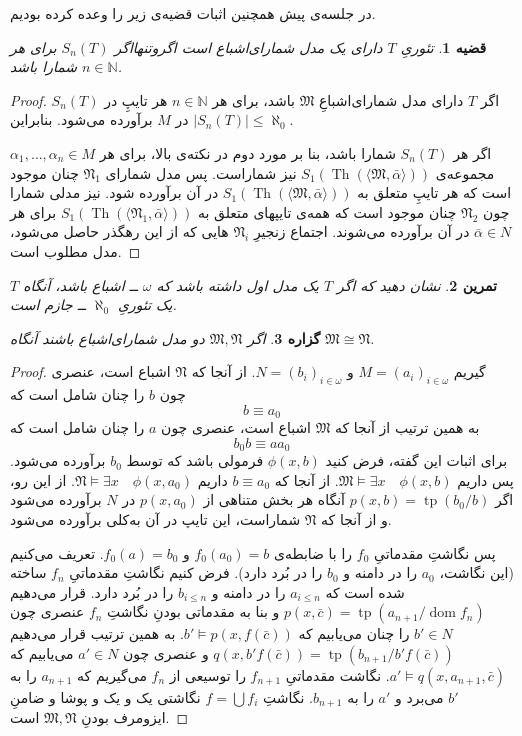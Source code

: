 \documentclass[12pt,a4paper]{article}
\theoremstyle{colorhead}
\newtheorem{thm}{قضیه}
\newtheorem{tam}[thm]{تمرین}
\newtheorem{prop}[thm]{گزاره}
\DeclareMathOperator{\Th}{Th}
\DeclareMathOperator{\dom}{dom}
\DeclareMathOperator{\tp}{tp}
\begin{document}
در جلسه‌ی پیش همچنین اثبات قضیه‌ی زیر را وعده کرده‌ بودیم.
\begin{thm}
تئوریِ
$T$
دارای یک مدل شمارای‌اشباع است اگروتنهااگر 
$S_n(T)$
برای هر
$n\in \mathbb{N}$
شمارا باشد. 
\end{thm}
\begin{proof}
اگر
$T$
دارای مدل شمارای‌اشباعِ
$\mathfrak{M}$ 
باشد، برای هر
$n\in \mathbb{N}$
هر تایپِ در
$S_n(T)$
در
$M$
برآورده می‌شود. بنابراین 
$|S_n(T)|\leq \aleph_0$.
\par 
اگر هر
$S_n(T)$
شمارا باشد، بنا بر مورد دوم
در نکته‌ی بالا، برای هر
$\alpha_1,\ldots,\alpha_n\in M$
مجموعه‌ی
$S_1(\Th(\langle \mathfrak{M},\bar{\alpha}\rangle))$
نیز شماراست. پس مدل شمارای 
$\mathfrak{N}_1$
چنان موجود است که هر تایپِ متعلق به
$S_1(\Th(\langle \mathfrak{M},\bar{\alpha}\rangle))$
در آن برآورده شود. نیز مدلی شمارا چون
$\mathfrak{N}_2$
چنان موجود است که همه‌ی تایپهای متعلق به 
$S_1(\Th(\langle \mathfrak{N}_1,\bar{\alpha}\rangle))$
برای هر
$\bar{\alpha}\in N$
در آن برآورده می‌شوند. اجتماع زنجیرِ
$\mathfrak{N}_i$
هایی که از این رهگذر حاصل می‌شود،‌ مدل مطلوب است.
\end{proof}
\begin{tam}
نشان دهید که اگر
$T$
یک مدل اول داشته باشد که
$\omega$
ــ
اشباع باشد، آنگاه $T$
یک تئوریِ
$\aleph_0$
ــ
جازم است. 
\end{tam}
\begin{prop}
اگر
$\mathfrak{M},\mathfrak{N}$
دو مدل شمارای‌اشباع باشند آنگاه
$\mathfrak{M}\cong \mathfrak{N}$.
\end{prop}
\begin{proof}
گیریم
$M=(a_i)_{i\in \omega}$
و
$N=(b_i)_{i\in \omega}$.
از آنجا که
$\mathfrak{N}$
اشباع است، عنصری چون
$b$
را  چنان شامل است که
\[
b\equiv a_0
\]
به همین ترتیب از آنجا که
$\mathfrak{M}$
اشباع است، عنصری چون
$a$
را چنان شامل است که
\[
b_0b\equiv aa_0
\]
برای اثبات این گفته، فرض کنید
$\phi(x,b)$
فرمولی باشد که توسط
$b_0$
برآورده می‌شود. پس داریم
$\mathfrak{M}\models \exists x\quad \phi(x,b)$.
از آنجا که
$b\equiv a_0$
داریم
$\mathfrak{N}\models \exists x\quad \phi(x,a_0)$.
از این رو، اگر 
$p(x,b)=\tp(b_0/b)$
آنگاه هر بخش متناهی از 
$p(x,a_0)$
در
$N$
برآورده می‌شود و از آنجا که
$\mathfrak{N}$
شماراست، این تایپ در آن به‌کلی برآورده می‌شود. 
\par 
پس نگاشتِ
مقدماتیِ
$f_0$
را با ضابطه‌ی
$f_0(a_0)=b$
و
$f_0(a)=b_0$.
تعریف می‌کنیم (این نگاشت،
$a_0$
را در دامنه و 
$b_0$
را در بُرد دارد). فرض کنیم نگاشتِ مقدماتیِ
$f_n$
ساخته شده است که 
$a_{i\leq n}$
را در دامنه و
$b_{i\leq n}$
را در بُرد دارد. 
قرار می‌دهیم
$p(x,\bar{c})=\tp(a_{n+1}/\dom f_n)$
و بنا به مقدماتی بودنِ
نگاشتِ
$f_n$
عنصری چون
$b'\in N$
را
چنان می‌یابیم که
$b'\models p(x,f(\bar{c}))$.
به همین ترتیب 
قرار می‌دهیم
$q(x,b'f(\bar{c}))=\tp(b_{n+1}/b'f(\bar{c}))$
 و 
عنصری چون
$a'\in N$
می‌یابیم که
$a'\models q(x,a_{n+1},\bar{c})$.
نگاشت مقدماتیِ
$f_{n+1}$
را توسیعی از
$f_n$
می‌گیریم که
$a_{n+1}$
را به
$b'$
می‌برد و 
$a'$
را
به
$b_{n+1}$.
نگاشتِ
$f=\bigcup f_i$
نگاشتی یک و یک و پوشا و ضامنِ
ایزومرف بودنِ
$\mathfrak{M},\mathfrak{N}$
است. 
\end{proof}
\end{document}
